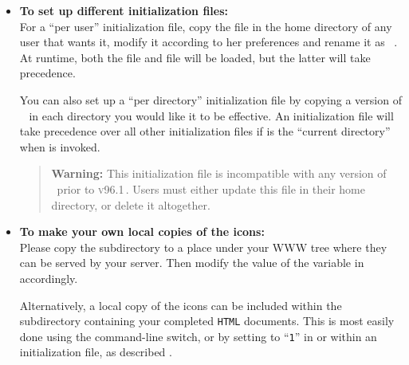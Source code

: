 \begin{itemize}
\par

%
%
\label{initfile}%
\item \textbf{To set up different initialization files:}\\
For a ``per user'' initialization file,
copy the file  in the home directory
of any user that wants it, modify it according to her preferences and
rename it as \ . At runtime, both the
 file and  file will be
loaded, but the latter will take precedence.

%

You can also set up a ``per directory'' initialization file by
copying a version of \  in each directory you
would like it to be effective. An initialization file
 will take precedence over all other
initialization files if  is the ``current directory'' when
\latextohtml{} is invoked.

%
\begin{quotation}\noindent
\textbf{Warning: }%
This initialization file is incompatible with
any version of \latextohtml\ prior to \textsc{v96.1}\,.
Users must either update this file in their home directory,
or delete it altogether.
\end{quotation}

%
\item \label{icondir}%
\textbf{To make your own local copies of the \latextohtml{} icons:} \\
Please copy the  subdirectory to a
place under your WWW tree
where they can be served by your server.
Then modify the value of the  variable in
 accordingly.
%
\begin{changebar}%
Alternatively, a local copy of the icons can be included within
the subdirectory containing your completed \texttt{HTML} documents.
This is most easily done using the  command-line switch,
or by setting  to ``\texttt{1}'' in 
or within an initialization file, as described .
\end{changebar}


\end{itemize}
